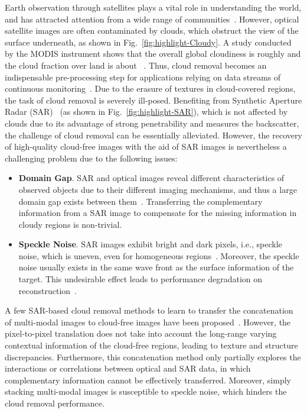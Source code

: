 \documentclass[a4paper,fleqn]{cas-dc}
\newcommand{\ie}[1]{{i.e.}}
\begin{document}
Earth observation through satellites plays a vital role in understanding the world, and has attracted attention from a wide range of communities~\citep{xia2018dota,requena2021earthnet2021,girard2021polygonal}. However, optical satellite images are often contaminated by clouds, which obstruct the view of the surface underneath, as shown in Fig.~\ref{fig:highlight-Cloudy}.
A study conducted by the MODIS instrument shows that the overall global cloudiness is roughly  and the cloud fraction over land is about ~\citep{king2013spatial}.
Thus, cloud removal becomes an indispensable pre-processing step for applications relying on data streams of continuous monitoring~\citep{ebel2020multisensor}. 
Due to the erasure of textures in cloud-covered regions, the task of cloud removal is severely ill-posed. 
Benefiting from Synthetic Aperture Radar (SAR)~\citep{bamler2000principles} (as shown in Fig.~\ref{fig:highlight-SAR}), which is not affected by clouds due to its advantage of strong penetrability and measures the backscatter, the challenge of cloud removal can be essentially alleviated. 
However, the recovery of high-quality cloud-free images with the aid of SAR images is nevertheless a challenging problem due to the following issues:
\begin{itemize}
	\item {\bf Domain Gap}. SAR and optical images reveal different characteristics of observed objects due to their different imaging mechanisms, and thus a large domain gap exists between them~\citep{schmitt2017fusion, liu2018can}. Transferring the complementary information from a SAR image to compensate for the missing information in cloudy regions is non-trivial.
	\item {\bf Speckle Noise}. SAR images exhibit bright and dark pixels, \ie{}, speckle noise, which is uneven, even for homogeneous regions~\citep{yu2018speckle, zhu2021deep}. Moreover, the speckle noise usually exists in the same wave front as the surface information of the target. This undesirable effect leads to performance degradation on reconstruction~\citep{fuentes2019sar, liu2021mrddanet}.
\end{itemize} 

A few SAR-based cloud removal methods to learn to transfer the concatenation of multi-modal images to cloud-free images have been proposed~\citep{gao2020cloud, meraner2020cloud, ebel2020multisensor}. However, the pixel-to-pixel translation does not take into account the long-range varying contextual information of the cloud-free regions, leading to texture and structure discrepancies. Furthermore, this concatenation method only partially explores the interactions or correlations between optical and SAR data, in which complementary information cannot be effectively transferred. Moreover, simply stacking multi-modal images is susceptible to speckle noise, which hinders the cloud removal performance.
\end{document}
